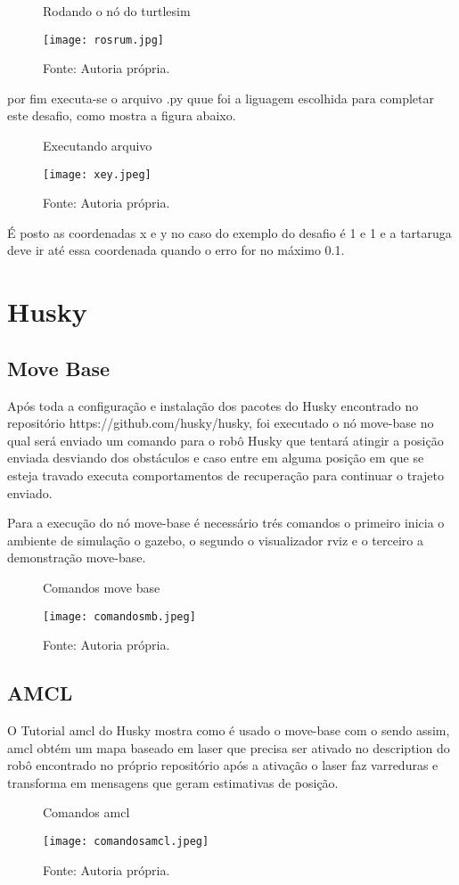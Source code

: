 \begin{figure} [h!]	
    \centering
    \caption{ Rodando o nó do turtlesim}
    \texttt{[image: rosrum.jpg]}
    \caption*{Fonte: Autoria própria.}
    \label{fig:rosrum}
\end{figure}
por fim executa-se o arquivo .py quue foi a liguagem escolhida para completar este desafio, como mostra a figura abaixo.
\begin{figure} [h!]	
    \centering
    \caption{ Executando arquivo}
    \texttt{[image: xey.jpeg]}
    \caption*{Fonte: Autoria própria.}
    \label{fig:excute.py}
\end{figure}
É posto as coordenadas x e y no caso do exemplo do desafio é 1 e 1 e a tartaruga deve ir até essa coordenada quando o erro for no máximo 0.1.
\section{Husky}
\subsection{Move Base}
Após toda a configuração e instalação dos pacotes do Husky encontrado no repositório https://github.com/husky/husky, foi executado o nó move-base no qual será enviado um comando para o robô Husky que tentará atingir a posição enviada desviando dos obstáculos e caso entre em alguma posição em que se esteja travado executa comportamentos de recuperação para continuar o trajeto enviado.

Para a execução do nó move-base é necessário trés comandos o primeiro inicia o ambiente de simulação o gazebo, o segundo o visualizador rviz e o terceiro a demonstração move-base.
\begin{figure} [h!]	
    \centering
    \caption{Comandos move base}
    \texttt{[image: comandosmb.jpeg]}
    \caption*{Fonte: Autoria própria.}
    \label{fig:movebase}
\end{figure}
\subsection{AMCL}
O Tutorial amcl do Husky mostra como é usado o move-base com o sendo assim, amcl obtém um mapa baseado em laser que precisa ser ativado no description do robô encontrado no próprio repositório após a ativação o laser faz varreduras e transforma em mensagens que geram estimativas de posição.
\begin{figure} [h!]	
    \centering
    \caption{Comandos amcl}
    \texttt{[image: comandosamcl.jpeg]}
    \caption*{Fonte: Autoria própria.}
    \label{fig:amcl}
\end{figure} 
